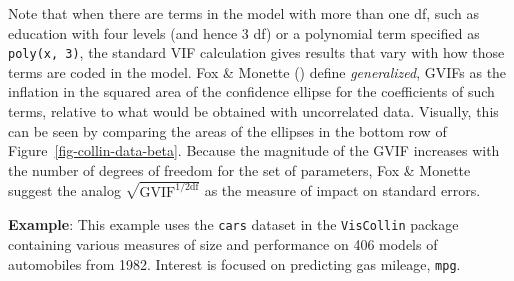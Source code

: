 \documentclass[
  letterpaper,
  10pt,
  krantz2]{krantz}
\makeatletter
\newenvironment{Shaded}{\begin{snugshade}}{\end{snugshade}}
\newcommand{\AttributeTok}[1]{\textcolor[rgb]{0.40,0.45,0.13}{#1}}
\newcommand{\CommentTok}[1]{\textcolor[rgb]{0.37,0.37,0.37}{#1}}
\newcommand{\FunctionTok}[1]{\textcolor[rgb]{0.28,0.35,0.67}{#1}}
\newcommand{\NormalTok}[1]{\textcolor[rgb]{0.00,0.23,0.31}{#1}}
\newcommand{\StringTok}[1]{\textcolor[rgb]{0.13,0.47,0.30}{#1}}
\newenvironment{kframe}{%
  \medskip{}
  \setlength{\fboxsep}{.8em}
  \def\at@end@of@kframe{}%
  \ifinner\ifhmode%
  \def\at@end@of@kframe{\end{minipage}}%
  \begin{minipage}{\columnwidth}%
  \fi\fi%
  \def\FrameCommand##1{\hskip\@totalleftmargin \hskip-\fboxsep
  \colorbox{shadecolor}{##1}\hskip-\fboxsep
      \hskip-\linewidth \hskip-\@totalleftmargin \hskip\columnwidth}%
  \MakeFramed {\advance\hsize-\width
    \@totalleftmargin\z@ \linewidth\hsize
    \@setminipage}}%
{\par\unskip\endMakeFramed%
  \at@end@of@kframe}
\renewenvironment{Shaded}{\begin{kframe}}{\end{kframe}}
\makeatother
\begin{document}
Note that when there are terms in the model with more than one df, such
as education with four levels (and hence 3 df) or a polynomial term
specified as \texttt{poly(x,\ 3)}, the standard VIF calculation gives
results that vary with how those terms are coded in the model. Fox \&
Monette () define \emph{generalized},
GVIFs as the inflation in the squared area of the confidence ellipse for
the coefficients of such terms, relative to what would be obtained with
uncorrelated data. Visually, this can be seen by comparing the areas of
the ellipses in the bottom row of Figure~\ref{fig-collin-data-beta}.
Because the magnitude of the GVIF increases with the number of degrees
of freedom for the set of parameters, Fox \& Monette suggest the analog
\(\sqrt{\text{GVIF}^{1/2 \text{df}}}\) as the measure of impact on
standard errors.

\textbf{Example}: This example uses the \texttt{cars} dataset in the
\texttt{VisCollin} package containing various measures of size and
performance on 406 models of automobiles from 1982. Interest is focused
on predicting gas mileage, \texttt{mpg}.

\begin{Shaded}
\end{Shaded}
\end{document}
